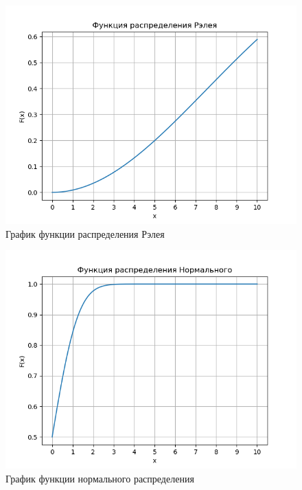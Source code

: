 \documentclass[a4]{article}
\begin{document}
\begin{center}
\begin{figure}[H]
\caption{График функции распределения Рэлея}
\includegraphics[width=\textwidth]{output/task2/rayleigh_chart.png}
\end{figure}

\begin{figure}[H]
\caption{График функции нормального распределения}
\includegraphics[width=\textwidth]{output/task2/norm_chart.png}
\end{figure}

\end{center}
\end{document}
